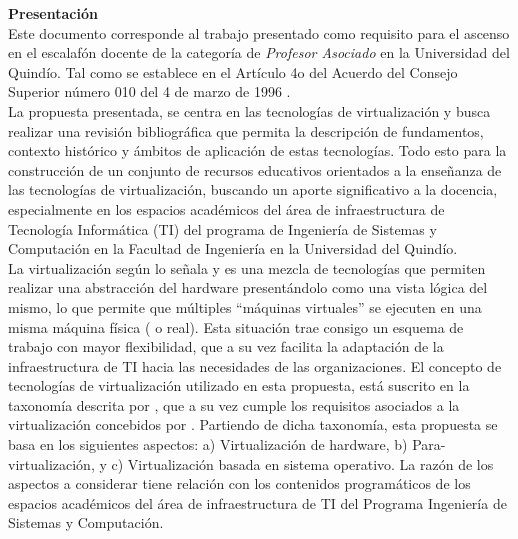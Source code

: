 
{\huge \textbf{Presentación}}\\

Este documento corresponde al trabajo presentado como requisito para el ascenso en el escalafón docente de la categoría de \textit{Profesor Asociado} en la Universidad del Quindío. Tal como se establece en el Artículo 4o del Acuerdo del Consejo Superior número 010 del 4 de marzo de 1996 \parencite{UQ1996}.\\

La propuesta presentada, se centra en las tecnologías de virtualización y busca  realizar una revisión bibliográfica que permita la descripción de fundamentos, contexto histórico y ámbitos de aplicación de estas tecnologías. Todo esto para la construcción de un conjunto de recursos educativos orientados a la enseñanza de las tecnologías de virtualización, buscando un aporte significativo a la docencia, especialmente en los espacios académicos del área de infraestructura de Tecnología Informática (TI) del programa de Ingeniería de Sistemas y Computación en la Facultad de Ingeniería en la Universidad del Quindío.\\

La virtualización según lo señala \textcite{Goldworm2007} y \textcite{Kusnetzky2011} es una mezcla de tecnologías que permiten realizar una abstracción del hardware presentándolo como una vista lógica del mismo, lo que permite que múltiples “máquinas virtuales” se ejecuten en una misma máquina física ( o real). Esta situación trae consigo un esquema de trabajo con mayor flexibilidad, que a su vez facilita la adaptación de la infraestructura de TI hacia las necesidades de las organizaciones. El concepto de tecnologías de virtualización utilizado en esta propuesta, está suscrito en la taxonomía descrita por \textcite{Pessolani2012}, que a su vez cumple los requisitos asociados a la virtualización concebidos por \textcite{Popek1974}. Partiendo de dicha taxonomía, esta propuesta se basa en los siguientes aspectos: a) Virtualización de hardware, b) Para-virtualización, y c) Virtualización basada en sistema operativo. La razón de los aspectos a considerar tiene relación con los contenidos programáticos de los espacios académicos del área de infraestructura de TI del Programa Ingeniería de Sistemas y Computación.\\

